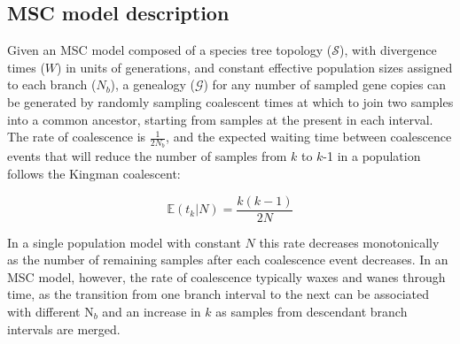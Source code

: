 \documentclass[11pt]{article}
\begin{document}



\subsection{MSC model description}
Given an MSC model composed of a species tree topology ($\mathcal{S}$), with divergence
times ($W$) in units of generations, and constant effective population sizes
assigned to each branch ($N_b$), a genealogy ($\mathcal{G}$) 
for any number of sampled gene copies can be generated by randomly sampling 
coalescent times %
at which to join two samples into a common ancestor, 
starting from samples at the present in each interval. The rate of coalescence
is $\frac{1}{2N_b}$, and the expected waiting time between coalescence events
that will reduce the number of samples from $k$ to $k$-1 in a population 
follows the Kingman coalescent:

\begin{equation}
	\mathbb{E}(t_k| N) = \frac{k(k-1)}{2N}
\end{equation}

\noindent In a single population model
with constant $N$ this rate decreases monotonically as the number of remaining 
samples after each coalescence event decreases. In an MSC model, however, 
the rate of coalescence typically waxes and wanes through time, as the
transition from one branch interval to the next can be associated with 
different N$_b$ and an increase in $k$ as samples from 
descendant branch intervals are merged.
\end{document}
